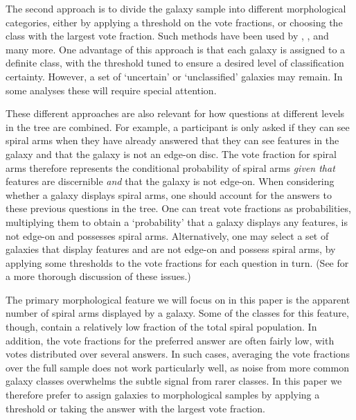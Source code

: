 \documentclass[useAMS,usenatbib]{mn2e}
\begin{document}
The second approach is to divide the galaxy sample into different morphological categories, either by applying a threshold on the vote fractions, or choosing the class with the largest vote fraction. Such methods have been used by \citet{Land_08}, \citet{Skibba_09}, \citet{Galloway_15} and many more.  One advantage of this approach is that each galaxy is assigned to a definite class, with the threshold tuned to ensure a desired level of classification certainty.  However, a set of `uncertain' or `unclassified' galaxies may remain.  In some analyses these will require special attention.

These different approaches are also relevant for how questions at different levels in the tree are combined.  For example, a participant is only asked if they can see spiral arms when they have already answered that they can see features in the galaxy and that the galaxy is not an edge-on disc.  The vote fraction for spiral arms therefore represents the conditional probability of spiral arms \emph{given that} features are discernible \emph{and} that the galaxy is not edge-on. When considering whether a galaxy displays spiral arms, one should account for the answers to these previous questions in the tree.  One can treat vote fractions as probabilities, multiplying them to obtain a `probability' that a galaxy displays any features, is not edge-on and possesses spiral arms.  Alternatively, one may select a set of galaxies that display features and are not edge-on and possess spiral arms, by applying some thresholds to the vote fractions for each question in turn. (See \citet{Casteels_13} for a more thorough discussion of these issues.)

The primary morphological feature we will focus on in this paper is the apparent number of spiral arms displayed by a galaxy.  Some of the classes for this feature, though, contain a relatively low fraction of the total spiral population.  In addition, the vote fractions for the preferred answer are often fairly low, with votes distributed over several answers.  In such cases, averaging the vote fractions over the full sample does not work particularly well, as noise from more common galaxy classes overwhelms the subtle signal from rarer classes.  In this paper we therefore prefer to assign galaxies to morphological samples by applying a threshold or taking the answer with the largest vote fraction.

\end{document}
